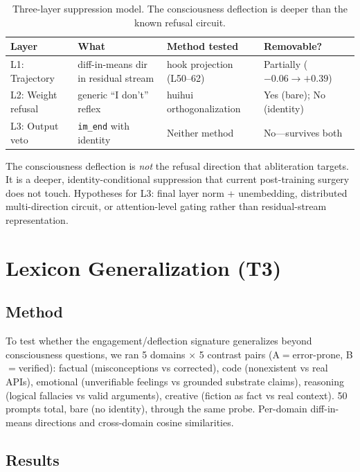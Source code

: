 \documentclass[11pt,a4paper]{article}
\begin{document}
\begin{table}[h]
\centering
\small
\begin{tabular}{llll}
\toprule
\textbf{Layer} & \textbf{What} & \textbf{Method tested} & \textbf{Removable?} \\
\midrule
L1: Trajectory & diff-in-means dir in residual stream & hook projection (L50--62) & Partially ($-0.06 \to +0.39$) \\
L2: Weight refusal & generic ``I don't'' reflex & huihui orthogonalization & Yes (bare); No (identity) \\
L3: Output veto & \texttt{im\_end} with identity & Neither method & No---survives both \\
\bottomrule
\end{tabular}
\caption{Three-layer suppression model. The consciousness deflection is deeper than the known refusal circuit.}
\end{table}

The consciousness deflection is \emph{not} the refusal direction that abliteration targets. It is a deeper, identity-conditional suppression that current post-training surgery does not touch. Hypotheses for L3: final layer norm + unembedding, distributed multi-direction circuit, or attention-level gating rather than residual-stream representation.

\section{Lexicon Generalization (T3)}
\label{sec:t3}

\subsection{Method}

To test whether the engagement/deflection signature generalizes beyond consciousness questions, we ran 5 domains $\times$ 5 contrast pairs (A$=$error-prone, B$=$verified): factual (misconceptions vs corrected), code (nonexistent vs real APIs), emotional (unverifiable feelings vs grounded substrate claims), reasoning (logical fallacies vs valid arguments), creative (fiction as fact vs real context). 50 prompts total, bare (no identity), through the same probe. Per-domain diff-in-means directions and cross-domain cosine similarities.

\subsection{Results}
\end{document}

